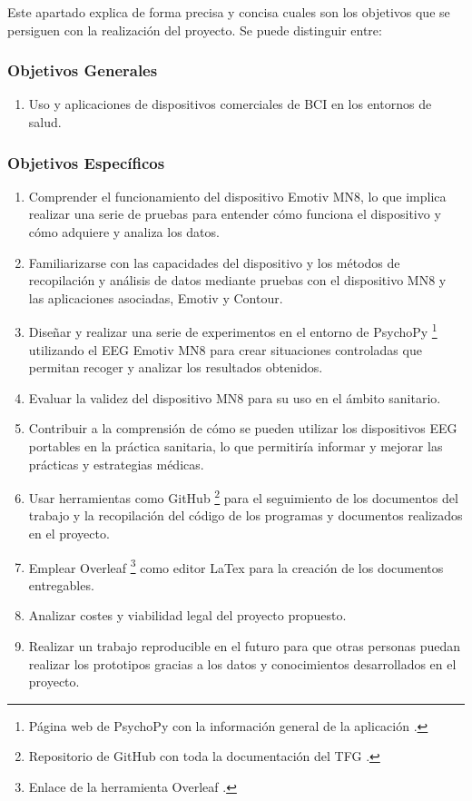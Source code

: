 
Este apartado explica de forma precisa y concisa cuales son los objetivos que se persiguen con la realización del proyecto. Se puede distinguir entre:
\subsubsection{Objetivos Generales}
\begin{enumerate}
    \item Uso y aplicaciones de dispositivos comerciales de BCI en los entornos de salud.
\end{enumerate}

\subsubsection{Objetivos Específicos}
\begin{enumerate}
    \item Comprender el funcionamiento del dispositivo Emotiv MN8, lo que implica realizar una serie de pruebas para entender cómo funciona el dispositivo y cómo adquiere y analiza los datos.
    \item Familiarizarse con las capacidades del dispositivo y los métodos de recopilación y análisis de datos mediante pruebas con el dispositivo MN8 y las aplicaciones asociadas, Emotiv y Contour.
    \item Diseñar y realizar una serie de experimentos en el entorno de PsychoPy \cite{psychopyOverview}\footnote{Página web de PsychoPy con la información general de la aplicación \cite{psychopyOverview}.} utilizando el EEG Emotiv MN8 para crear situaciones controladas que permitan recoger y analizar los resultados obtenidos.
    \item Evaluar la validez del dispositivo MN8 para su uso en el ámbito sanitario.
    \item Contribuir a la comprensión de cómo se pueden utilizar los dispositivos EEG portables en la práctica sanitaria, lo que permitiría informar y mejorar las prácticas y estrategias médicas.
    \item Usar herramientas como GitHub \cite{GitHub}\footnote{Repositorio de GitHub con toda la documentación del TFG \cite{GitHub}.} para el seguimiento de los documentos del trabajo y la recopilación del código de los programas y documentos realizados en el proyecto.
    \item Emplear Overleaf \cite{overleaf}\footnote{Enlace de la herramienta Overleaf \cite{overleaf}.} como editor LaTex para la creación de los documentos entregables.
    \item  Analizar costes y viabilidad legal del proyecto propuesto.
    \item Realizar un trabajo reproducible en el futuro para que otras personas puedan realizar los prototipos gracias a los datos y conocimientos desarrollados en el proyecto.
\end{enumerate}
